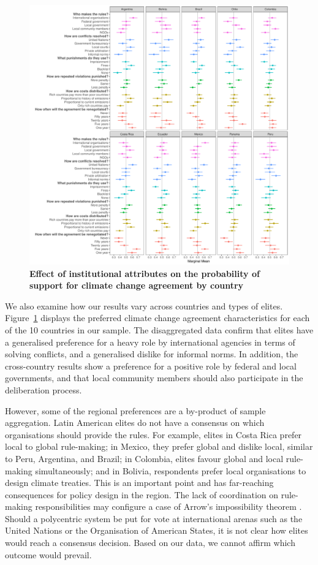 \documentclass[a4paper,12pt]{article}
\begin{document}
\begin{figure}[H]
	\centering
	\includegraphics[width=\linewidth]{countries.pdf}
	\caption{\textbf{Effect of institutional attributes on the probability of support for climate change agreement by country}}
	\label{fig:countries}
\end{figure}

We also examine how our results vary across countries and types of elites. Figure~\ref{fig:countries} displays the preferred climate change agreement characteristics for each of the 10 countries in our sample. The disaggregated data confirm that elites have a generalised preference for a heavy role by international agencies in terms of solving conflicts, and a generalised dislike for informal norms. In addition, the cross-country results show a preference for a positive role by federal and local governments, and that local community members should also participate in the deliberation process.

However, some of the regional preferences are a by-product of sample aggregation. Latin American elites do not have a consensus on which organisations should provide the rules. For example, elites in Costa Rica prefer local to global rule-making; in Mexico, they prefer global and dislike local, similar to Peru, Argentina, and Brazil; in Colombia, elites favour global and local rule-making simultaneously; and in Bolivia, respondents prefer local organisations to design climate treaties. This is an important point and has far-reaching consequences for policy design in the region. The lack of coordination on rule-making responsibilities may configure a case of Arrow's impossibility theorem \citep{arrow1950difficulty}. Should a polycentric system be put for vote at international arenas such as the United Nations or the Organisation of American States, it is not clear how elites would reach a consensus decision. Based on our data, we cannot affirm which outcome would prevail. 
\end{document}
